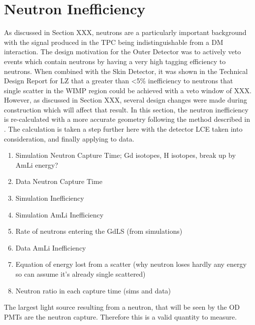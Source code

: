 \section{Neutron Inefficiency}
\par
As discussed in Section XXX, neutrons are a particularly important background with the signal produced in the TPC being indistinguishable from a DM interaction.
The design motivation for the Outer Detector was to actively veto events which contain neutrons by having a very high tagging efficiency to neutrons.
When combined with the Skin Detector, it was shown in the Technical Design Report for LZ that a greater than <5\% inefficiency to neutrons that single scatter in the WIMP region could be achieved with a veto window of XXX.
However, as discussed in Section XXX, several design changes were made during construction which will affect that result.
In this section, the neutron inefficiency is re-calculated with a more accurate geometry following the method described in \cite{sallyshaw_thesis_ref}.
The calculation is taken a step further here with the detector LCE taken into consideration, and finally applying to data. 



\begin{tcolorbox}[colback=red!5!white, colframe=red!50!black, title=Key Plots]
\begin{enumerate}
    \item Simulation Neutron Capture Time; Gd isotopes, H isotopes, break up by AmLi energy?
    \item Data Neutron Capture Time
    \item Simulation Inefficiency
    \item Simulation AmLi Inefficiency
    \item Rate of neutrons entering the GdLS (from simulations)
    \item Data AmLi Inefficiency
    \item Equation of energy lost from a scatter (why neutron loses hardly any energy so can assume it's already single scattered)
    \item Neutron ratio in each capture time (sims and data)
\end{enumerate}
\end{tcolorbox}

\par
The largest light source resulting from a neutron, that will be seen by the OD PMTs are the neutron capture.
Therefore this is a valid quantity to measure.


